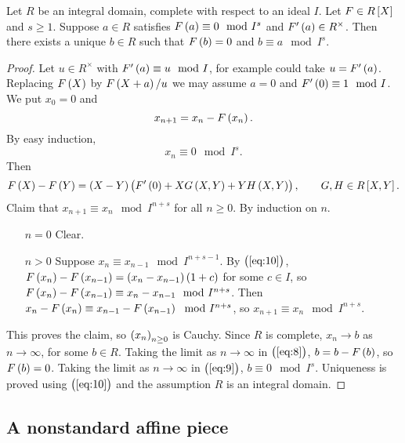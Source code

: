 \begin{lemma}
\label{lem:8.1}
Let $ R $ be an integral domain, complete with respect to an ideal $ I $. Let $ F \in R\sbr{X} $ and $ s \ge 1 $. Suppose $ a \in R $ satisfies $ F\br{a} \equiv 0 \mod I^s $ and $ F'\br{a} \in R^\times $. Then there exists a unique $ b \in R $ such that $ F\br{b} = 0 $ and $ b \equiv a \mod I^s $.
\end{lemma}

\begin{proof}
Let $ u \in R^\times $ with $ F'\br{a} \equiv u \mod I $, for example could take $ u = F'\br{a} $. Replacing $ F\br{X} $ by $ F\br{X + a} / u $ we may assume $ a = 0 $ and $ F'\br{0} \equiv 1 \mod I $. We put $ x_0 = 0 $ and
\begin{equation}
\label{eq:8}
x_{n + 1} = x_n - F\br{x_n}.
\end{equation}
By easy induction,
\begin{equation}
\label{eq:9}
x_n \equiv 0 \mod I^s.
\end{equation}
Then
\begin{equation}
\label{eq:10}
F\br{X} - F\br{Y} = \br{X - Y}\br{F'\br{0} + XG\br{X, Y} + YH\br{X, Y}}, \qquad G, H \in R\sbr{X, Y}.
\end{equation}
Claim that $ x_{n + 1} \equiv x_n \mod I^{n + s} $ for all $ n \ge 0 $. By induction on $ n $.
\begin{itemize}[leftmargin=0.5in]
\item[$ n = 0 $] Clear.
\item[$ n > 0 $] Suppose $ x_n \equiv x_{n - 1} \mod I^{n + s - 1} $. By $ \br{\ref{eq:10}} $, $ F\br{x_n} - F\br{x_{n - 1}} = \br{x_n - x_{n - 1}}\br{1 + c} $ for some $ c \in I $, so $ F\br{x_n} - F\br{x_{n - 1}} \equiv x_n - x_{n - 1} \mod I^{n + s} $. Then $ x_n - F\br{x_n} \equiv x_{n - 1} - F\br{x_{n - 1}} \mod I^{n + s} $, so $ x_{n + 1} \equiv x_n \mod I^{n + s} $.
\end{itemize}
This proves the claim, so $ \br{x_n}_{n \ge 0} $ is Cauchy. Since $ R $ is complete, $ x_n \to b $ as $ n \to \infty $, for some $ b \in R $. Taking the limit as $ n \to \infty $ in $ \br{\ref{eq:8}} $, $ b = b - F\br{b} $, so $ F\br{b} = 0 $. Taking the limit as $ n \to \infty $ in $ \br{\ref{eq:9}} $, $ b \equiv 0 \mod I^s $. Uniqueness is proved using $ \br{\ref{eq:10}} $ and the assumption $ R $ is an integral domain.
\end{proof}

\subsection{A nonstandard affine piece}

